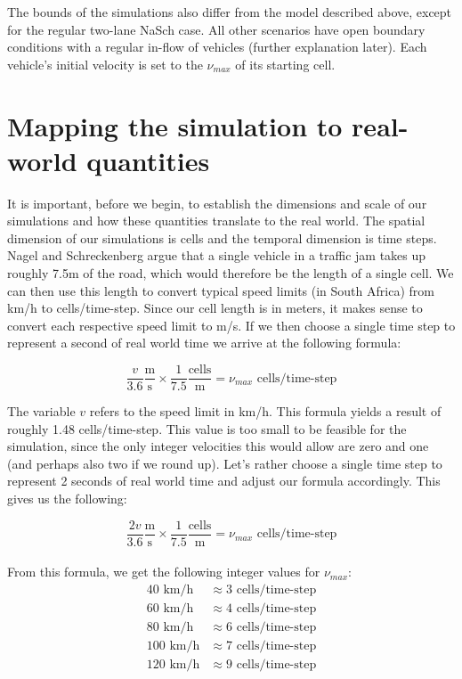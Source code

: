 \documentclass[11pt]{article}
\begin{document}
	The bounds of the simulations also differ from the model described above, except for the regular two-lane NaSch case. All other scenarios have open boundary conditions with a regular in-flow of vehicles (further explanation later). Each vehicle's initial velocity is set to the $\nu_{max}$ of its starting cell. 
	
	\section{Mapping the simulation to real-world quantities}\label{sec:quantmap}
	
	It is important, before we begin, to establish the dimensions and scale of our simulations and how these quantities translate to the real world. The spatial dimension of our simulations is cells and the temporal dimension is time steps. Nagel and Schreckenberg argue that a single vehicle in a traffic jam takes up roughly 7.5m of the road, which would therefore be the length of a single cell. We can then use this length to convert typical speed limits (in South Africa) from km/h to cells/time-step. Since our cell length is in meters, it makes sense to convert each respective speed limit to m/s. If we then choose a single time step to represent a second of real world time we arrive at the following formula:
	
	\[ \frac{v}{3.6} \frac{\text{m}}{\text{s}} \times \frac{1}{7.5} \frac{\text{cells}}{\text{m}} = \nu_{max} \text{ cells/time-step} \]
	
	The variable $v$ refers to the speed limit in km/h. 
	This formula yields a result of roughly 1.48 cells/time-step. This value is too small to be feasible for the simulation, since the only integer velocities this would allow are zero and one (and perhaps also two if we round up). Let's rather choose a single time step to represent 2 seconds of real world time and adjust our formula accordingly. This gives us the following:
	
	\[ \frac{2v}{3.6} \frac{\text{m}}{\text{s}} \times \frac{1}{7.5} \frac{\text{cells}}{\text{m}} = \nu_{max} \text{ cells/time-step} \] \\
	
	From this formula, we get the following integer values for $\nu_{max}$:
	\begin{align*}
		40 \text{ km/h} &\approx 3 \text{ cells/time-step} \\
		60 \text{ km/h} &\approx 4 \text{ cells/time-step} \\
		80 \text{ km/h} &\approx 6 \text{ cells/time-step} \\
		100 \text{ km/h} &\approx 7 \text{ cells/time-step} \\
		120 \text{ km/h} &\approx 9 \text{ cells/time-step} \\
	\end{align*}
\end{document}
